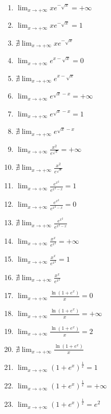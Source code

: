 \documentclass[11pt,a4paper]{article}
\begin{document}
\begin{enumerate}
\item $\displaystyle \lim_{x \to +\infty} x e^{-\sqrt{x}} = +\infty$
\item $\displaystyle \lim_{x \to +\infty} x e^{-\sqrt{x}} = 1$
\item $\displaystyle \nexists \lim_{x \to +\infty} x e^{-\sqrt{x}}$
\item $\displaystyle \lim_{x \to +\infty} e^{x - \sqrt{x}} = 0$
\item $\displaystyle \nexists \lim_{x \to +\infty} e^{x - \sqrt{x}}$
\item $\displaystyle \lim_{x \to +\infty} e^{\sqrt{x} - x} = +\infty$
\item $\displaystyle \lim_{x \to +\infty} e^{\sqrt{x} - x} = 1$
\item $\displaystyle \nexists \lim_{x \to +\infty} e^{\sqrt{x} - x}$
\item $\displaystyle \lim_{x \to +\infty} \frac{x^{2}}{e^{\sqrt{x}}} = +\infty$
\item $\displaystyle \nexists \lim_{x \to +\infty} \frac{x^{2}}{e^{\sqrt{x}}}$
\item $\displaystyle \lim_{x \to +\infty} \frac{e^{x^{2}}}{e^{x^{2} - x}} = 1$
\item $\displaystyle \lim_{x \to +\infty} \frac{e^{x^{2}}}{e^{x^{2} - x}} = 0$
\item $\displaystyle \nexists \lim_{x \to +\infty} \frac{e^{x^{2}}}{e^{x^{2} - x}}$
\item $\displaystyle \lim_{x \to +\infty} \frac{x^{x}}{e^{x^{2}}} = +\infty$
\item $\displaystyle \lim_{x \to +\infty} \frac{x^{x}}{e^{x^{2}}} = 1$
\item $\displaystyle \nexists \lim_{x \to +\infty} \frac{x^{x}}{e^{x^{2}}}$
\item $\displaystyle \lim_{x \to +\infty} \frac{\ln\left(1 + e^{x}\right)}{x} = 0$
\item $\displaystyle \lim_{x \to +\infty} \frac{\ln\left(1 + e^{x}\right)}{x} = +\infty$
\item $\displaystyle \lim_{x \to +\infty} \frac{\ln\left(1 + e^{x}\right)}{x} = 2$
\item $\displaystyle \nexists \lim_{x \to +\infty} \frac{\ln\left(1 + e^{x}\right)}{x}$
\item $\displaystyle \lim_{x \to +\infty} \left(1 + e^{x}\right)^{\frac{1}{x}} = 1$
\item $\displaystyle \lim_{x \to +\infty} \left(1 + e^{x}\right)^{\frac{1}{x}} = +\infty$
\item $\displaystyle \lim_{x \to +\infty} \left(1 + e^{x}\right)^{\frac{1}{x}} = e^{2}$

\end{enumerate}
\end{document}
